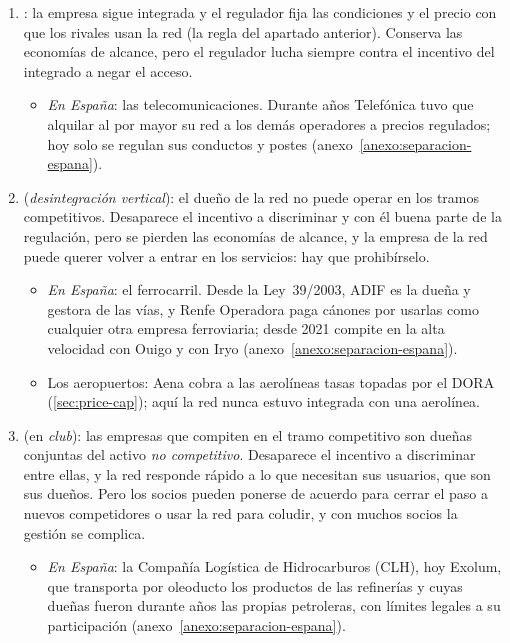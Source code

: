 \documentclass[11pt]{article}
\begin{document}
\begin{enumerate}
\item {}: la empresa sigue integrada y el regulador fija las condiciones y el precio con que los rivales usan la red (la regla del apartado anterior). Conserva las economías de alcance, pero el regulador lucha siempre contra el incentivo del integrado a negar el acceso.
  \begin{itemize}
  \item \emph{En España}: las telecomunicaciones. Durante años Telefónica tuvo que alquilar al por mayor su red a los demás operadores a precios regulados; hoy solo se regulan sus conductos y postes (anexo~\ref{anexo:separacion-espana}).
  \end{itemize}
\item {} (\emph{desintegración vertical}): el dueño de la red no puede operar en los tramos competitivos. Desaparece el incentivo a discriminar y con él buena parte de la regulación, pero se pierden las economías de alcance, y la empresa de la red puede querer volver a entrar en los servicios: hay que prohibírselo.
  \begin{itemize}
  \item \emph{En España}: el ferrocarril. Desde la Ley~39/2003, ADIF es la dueña y gestora de las vías, y Renfe Operadora paga cánones por usarlas como cualquier otra empresa ferroviaria\nocite{BOE2003LSF}; desde 2021 compite en la alta velocidad con Ouigo y con Iryo (anexo~\ref{anexo:separacion-espana}).
  \item Los aeropuertos: Aena cobra a las aerolíneas tasas topadas por el DORA (\ref{sec:price-cap}); aquí la red nunca estuvo integrada con una aerolínea.
  \end{itemize}
\item {} (en \emph{club}): las empresas que compiten en el tramo competitivo son dueñas conjuntas del activo \emph{no competitivo}. Desaparece el incentivo a discriminar entre ellas, y la red responde rápido a lo que necesitan sus usuarios, que son sus dueños. Pero los socios pueden ponerse de acuerdo para cerrar el paso a nuevos competidores o usar la red para coludir, y con muchos socios la gestión se complica.
  \begin{itemize}
  \item \emph{En España}: la Compañía Logística de Hidrocarburos (CLH), hoy Exolum, que transporta por oleoducto los productos de las refinerías y cuyas dueñas fueron durante años las propias petroleras, con límites legales a su participación (anexo~\ref{anexo:separacion-espana}).

\end{itemize}
\end{enumerate}
\end{document}
